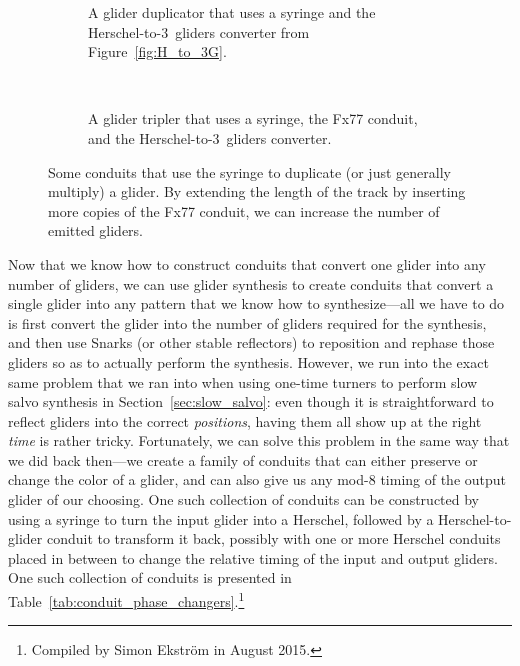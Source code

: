 \begin{figure}[!htb]
	\centering
	\begin{subfigure}{.38\textwidth}
		\centering
		\caption{A glider duplicator that uses a syringe and the Herschel-to-$3$~gliders converter from Figure~\ref{fig:H_to_3G}.}\label{fig:glider_duplicator}
	\end{subfigure} \ \ \ \ %
	\begin{subfigure}{.58\textwidth}
		\centering
		\caption{A glider tripler that uses a syringe, the Fx77 conduit, and the Herschel-to-$3$~gliders converter.}
		\label{fig:glider_tripler}
	\end{subfigure}
	\caption{Some conduits that use the syringe to duplicate (or just generally multiply) a glider. By extending the length of the track by inserting more copies of the Fx77 conduit, we can increase the number of emitted gliders.}\label{fig:glider_multipliers}
\end{figure}

Now that we know how to construct conduits that convert one glider into any number of gliders, we can use glider synthesis to create conduits that convert a single glider into any pattern that we know how to synthesize---all we have to do is first convert the glider into the number of gliders required for the synthesis, and then use Snarks (or other stable reflectors) to reposition and rephase those gliders so as to actually perform the synthesis. However, we run into the exact same problem that we ran into when using one-time turners to perform slow salvo synthesis in Section~\ref{sec:slow_salvo}: even though it is straightforward to reflect gliders into the correct \emph{positions}, having them all show up at the right \emph{time} is rather tricky. Fortunately, we can solve this problem in the same way that we did back then---we create a family of conduits that can either preserve or change the color of a glider, and can also give us any mod-$8$ timing of the output glider of our choosing. One such collection of conduits can be constructed by using a syringe to turn the input glider into a Herschel, followed by a Herschel-to-glider conduit to transform it back, possibly with one or more Herschel conduits placed in between to change the relative timing of the input and output gliders. One such collection of conduits is presented in Table~\ref{tab:conduit_phase_changers}.\footnote{Compiled by Simon Ekstr\"{o}m in August 2015.}


